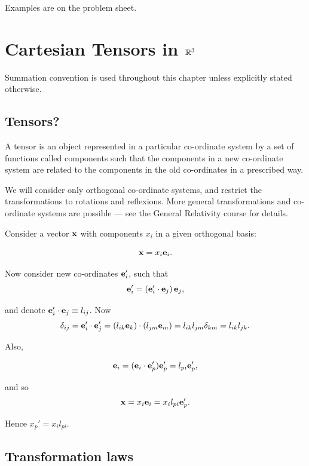 \documentclass{notes}
\theoremstyle{plain}
\begin{document}
Examples are on the problem sheet.

\chapter{Cartesian Tensors in $\mathbb{R}^3$}

Summation convention is used throughout this chapter unless
explicitly stated otherwise.

\section{Tensors?}

A tensor is an object represented in a particular co-ordinate system
by a set of functions called components such that the components in a
new co-ordinate system are related to the components in the old
co-ordinates in a prescribed way.

We will consider only orthogonal co-ordinate systems, and restrict the
transformations to rotations and reflexions.  More general
transformations and co-ordinate systems are possible --- see the
General Relativity course for details.

Consider a vector $\mathbf{x}$ with components $x_i$ in a given
orthogonal basis:

\[
\mathbf{x} = x_i \mathbf{e}_i.
\]

Now consider new co-ordinates $\mathbf{e}_i'$, such that
\[
\mathbf{e}_i' = \left(\mathbf{e}_i' \cdot \mathbf{e}_j \right) \mathbf{e}_j,
\]

and denote $\mathbf{e}_i' \cdot \mathbf{e}_j \equiv l_{ij}$.  Now
\[
\delta_{ij} = \mathbf{e}_i' \cdot \mathbf{e}_j'
= \left(l_{ik} \mathbf{e}_k\right) \cdot \left( l_{jm} \mathbf{e}_m\right)
= l_{i k} l_{j m} \delta_{k m} = l_{i k} l_{j k}.
\]

Also,

\[
\mathbf{e}_i = (\mathbf{e}_i \cdot \mathbf{e}_p') \mathbf{e}_p' = l_{pi} \mathbf{e}_p',
\]

and so
\[
\mathbf{x} = x_i \mathbf{e}_i = x_i l_{pi} \mathbf{e}_p'.
\]

Hence $x_p' = x_i l_{pi}$.

\section{Transformation laws}
\end{document}
